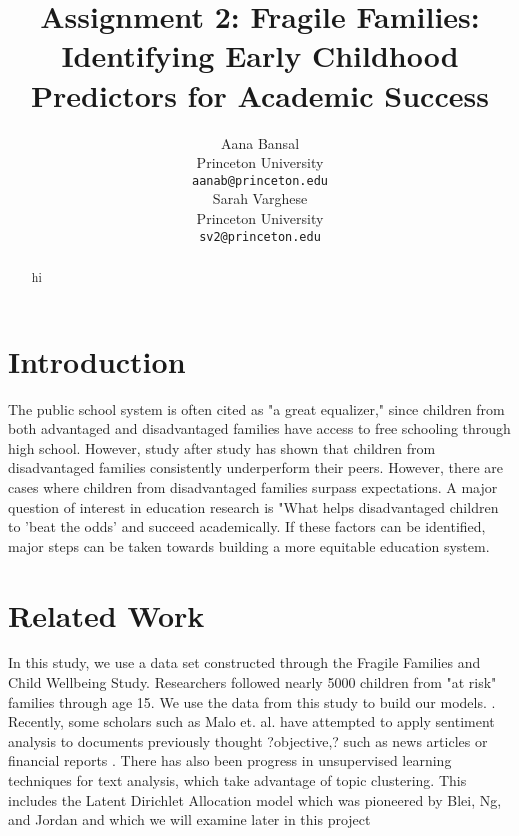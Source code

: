 \documentclass{article} %
\title{Assignment 2: Fragile Families: Identifying Early Childhood Predictors for Academic Success}
\author{
Aana Bansal\\
Princeton University\\
\texttt{aanab@princeton.edu} \\
\And
Sarah Varghese \\
Princeton University \\
\texttt{sv2@princeton.edu} \\
}
\begin{document}
\maketitle

\begin{abstract}
hi
\end{abstract}

\section{Introduction}

The public school system is often cited as "a great equalizer," since children from both advantaged and disadvantaged families have access to free schooling through high school. However, study after study has shown that children from disadvantaged families consistently underperform their peers. However, there are cases where children from disadvantaged families surpass expectations. A major question of interest in education research is "What helps disadvantaged children to 'beat the odds' and succeed academically. If these factors can be identified, major steps can be taken towards building a more equitable education system. 

\section{Related Work}
In this study, we use a data set constructed through the Fragile Families and Child Wellbeing Study. Researchers followed nearly 5000 children from "at risk" families through age 15. We use the data from this study to build our models.  \cite{huq2017}. Recently, some scholars such as Malo et. al. have attempted to apply sentiment analysis to documents previously thought ?objective,? such as news articles or financial reports \cite{pmalo2009}. There has also been progress in unsupervised learning techniques for text analysis, which take advantage of topic clustering. This includes the Latent Dirichlet Allocation model which was pioneered by Blei, Ng, and Jordan and which we will examine later in this project \cite{blei2003}
\end{document}
